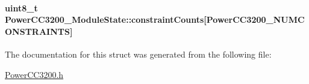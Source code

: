\paragraph[{constraint\+Counts}]{\setlength{\rightskip}{0pt plus 5cm}uint8\+\_\+t Power\+C\+C3200\+\_\+\+Module\+State\+::constraint\+Counts\mbox{[}{\bf Power\+C\+C3200\+\_\+\+N\+U\+M\+C\+O\+N\+S\+T\+R\+A\+I\+N\+T\+S}\mbox{]}}\label{struct_power_c_c3200___module_state_a8b8b36c45836ff40a33384cf3282bf0f}


The documentation for this struct was generated from the following file\+:\begin{DoxyCompactItemize}
\item 
\hyperlink{_power_c_c3200_8h}{Power\+C\+C3200.\+h}\end{DoxyCompactItemize}
